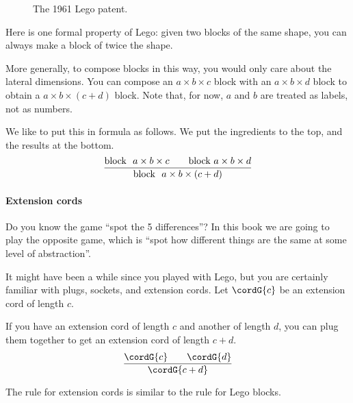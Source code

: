 

\begin{figure}[p]
  \centering
%
  \caption{The 1961 Lego patent.}
\end{figure}
Here is one formal property of Lego: given two blocks of the same shape, you can always make a block of twice the shape.

More generally, to compose blocks in this way, you would only care about the lateral dimensions.
You can compose an $a \times b \times c$ block with an  $a \times b \times d$ block to obtain a  $a \times b \times( c + d)$ block.
Note that, for now, $a$ and $b$ are treated as labels, not as numbers.

We like to put this in formula as follows. We put the ingredients to the top, and the results at the bottom.
%
\begin{equation}
  \frac{\text{block }\ a \times b \times c \qquad\text{block}\ a \times b \times d }{%
    \text{block }\ a \times b \times (c+d)%
  }
\end{equation}

\paragraph{Extension cords}

Do you know the game ``spot the 5 differences''? In this book we are going to play the opposite game, which is ``spot how different things are the same at some level of abstraction''.

It might have been a while since you played with Lego, but you are certainly familiar with plugs, sockets, and extension cords.
Let $\cordG{c}$ be an extension cord of length $c$.

If you have an extension cord of length $c$ and another of length $d$, you can plug them together to get an extension cord of length $c+d$.
%
\begin{equation}
  \frac{\cordG{c} \qquad \cordG{d} }{%
    \cordG{c+d}%
  }
\end{equation}

The rule for extension cords is similar to the rule for Lego blocks.
%


